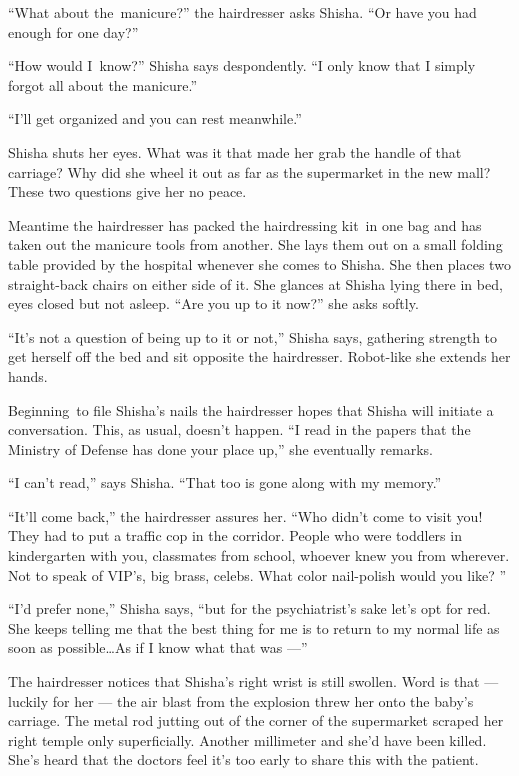\documentclass[twoside,11pt]{book}
\begin{document}
``What about the~manicure?'' the hairdresser asks Shisha. ``Or have you had
enough for one day?''

``How would I~know?'' Shisha says despondently. ``I only know that I simply
forgot all about the manicure.''

``I'll get organized and you can rest meanwhile.''

Shisha shuts her eyes. What was it that made her grab the handle of that carriage? Why did she wheel it out as far as
the supermarket in the new mall? These two questions give her no peace.

Meantime the hairdresser has packed the hairdressing kit~in one bag and has taken out the manicure tools from another.
She lays them out on a small folding table provided by the hospital whenever she comes to Shisha. She then places two
straight-back chairs on either side of it. She glances at Shisha lying there in bed, eyes closed but not asleep.
``Are you up to it now?'' she asks softly.

``It's not a question of being up to it or not,'' Shisha says, gathering strength to get
herself off the bed and sit opposite the hairdresser. Robot-like she extends her hands.

Beginning~to file Shisha's nails the hairdresser hopes that Shisha will initiate a conversation. This, as usual,
doesn't happen. ``I read in the papers that the Ministry of Defense has done your place up,''
she eventually remarks.

``I can't read,'' says Shisha. ``That too is gone along with my
memory.''

``It'll come back,'' the hairdresser assures her. ``Who didn't come to visit you!
They had to put a traffic cop in the corridor. People who were toddlers in kindergarten with you, classmates from
school, whoever knew you from wherever. Not to speak of VIP's, big brass, celebs. What color nail-polish would you
like? ''

``I'd{ }prefer none,'' Shisha says,
``but for the psychiatrist's sake let's opt for red. She keeps telling me that the best thing for me is to
return to my normal life as soon as possible{\ldots}As if I know what that was ---''

The hairdresser notices that Shisha's right wrist is still swollen. Word is that --- luckily for her --- the air blast from
the explosion threw her onto the baby's carriage. The metal rod jutting out of the corner of the supermarket scraped
her right temple only superficially. Another millimeter and she'd have been killed. She's heard that the doctors feel
it's too early to share this with the patient.
\end{document}
